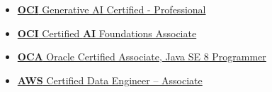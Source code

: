 


\begin{itemize}
    \item \href{https://catalog-education.oracle.com/pls/certview/sharebadge?id=ADD767D84DA01EB69622F1AB66FB4FDDE8AFF7EDF09F457892267F8F47B32223}{\textbf{OCI} Generative AI Certified - Professional}

    \item \href{https://catalog-education.oracle.com/ords/certview/sharebadge?id=0E10859CE5EC08BE64B8C49CFB7338F0B536D8ABCF7CCBC65D81C721A9D7C493}{\textbf{OCI} Certified \textbf{AI} Foundations Associate
}

    \item \href{https://catalog-education.oracle.com/ords/certview/sharebadge?id=85C60C7DFD7A93D3A73B15E108E58AE3CC64AA537C93C0F6A6E723F4A04A07DE}{\textbf{OCA} Oracle Certified Associate, Java SE 8 Programmer}


    \item \href{https://www.credly.com/badges/72c139dc-18b0-4626-846f-0d9d832723c8}
    {\textbf{AWS} Certified Data Engineer – Associate}
    
   
\end{itemize}


